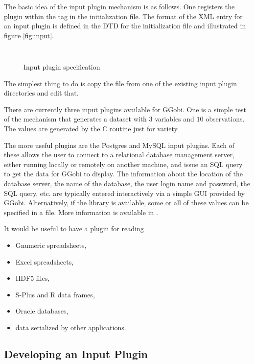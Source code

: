 \documentclass{article}
\begin{document}
The basic idea of the input plugin mechanism is as follows.  One
registers the plugin within the  tag in the
initialization file.  The format of the XML entry for an input plugin
is defined in the DTD for the initialization file and illustrated in
figure \ref{fig:input}.

\begin{figure}[htbp]
  \begin{center}
    \leavevmode
\begin{verbatim}
    
\end{verbatim}
    \caption{Input plugin specification}
  \end{center}
\end{figure}

The simplest thing to do is copy the  file from one
of the existing input plugin directories and edit that.

There are currently three input plugins available for GGobi.  One is a
simple test of the mechanism that generates a dataset with $3$
variables and $10$ observations.  The values are generated by the C
routine  just for variety.

The more useful plugins are the Postgres and MySQL input plugins.
Each of these allows the user to connect to a relational database
management server, either running locally or remotely on another
machine, and issue an SQL query to get the data for GGobi to display.
The information about the location of the database server, the name of
the database, the user login name and password, the SQL query, etc.
are typically entered interactively via a simple GUI provided by
GGobi.  Alternatively, if the  library is
available, some or all of these values can be specified in a file.
More information is available in .


It would be useful to have a plugin for reading 
\begin{itemize}
\item Gnumeric spreadsheets,
\item Excel spreadsheets,
\item HDF5 files,
\item S-Plus and R data frames,
\item Oracle databases,
\item data serialized by other applications.
\end{itemize}

\subsection{Developing an Input Plugin}
\end{document}
